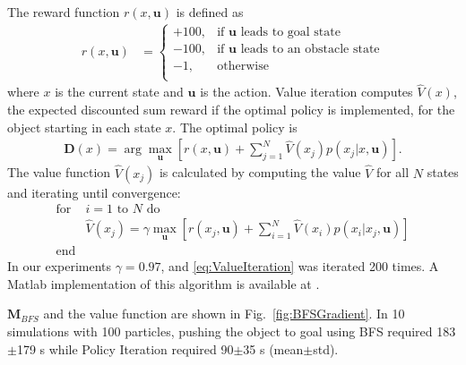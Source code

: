 The reward function $r(x,\mathbf{u})$ is defined as
\begin{align}
r(x,\mathbf{u}) &=  \left\{
\begin{array}{ll}
     +100, &  \textrm{if } \mathbf{u} \textrm{ leads to goal state}\\
      -100, & \textrm{if } \mathbf{u} \textrm{ leads to an obstacle state} \\
      -1, & \textrm{otherwise}\\
\end{array} 
\right.
\end{align}
 where $x$ is the current state and $\mathbf{u}$ is the action.   %
  Value iteration computes $\hat{V}(x)$, the expected discounted sum reward if the optimal policy is implemented, for the object starting in each state $x$. The optimal policy is %
   \begin{align} \mathbf{D}(x) = \arg\max_{\mathbf{u}}   [ r(x,\mathbf{u}) + \sum\limits_{j=1}^N \hat{V}(x_j) p(x_j|x, \mathbf{u})].  \label{eq:OptimalPolicy}
   \end{align}
   The value function $\hat{V}(x_j) $ is calculated by computing the value $\hat{V}$ for all $N$ states and iterating until convergence:
\begin{align}
\text{for }&\text{$i=1$ to $N$ do} \nonumber \\
&\hat{V} (x_j) = \gamma \max_{\mathbf{u}} [r(x_j,\mathbf{u}) + \sum\limits_{i=1}^N \hat{V}(x_i) p(x_i| x_j,\mathbf{u})] \label{eq:ValueIteration} \nonumber\\
\text{end}& 
\end{align}
In our experiments $\gamma = 0.97$, and \eqref{eq:ValueIteration} was iterated 200 times. A {\sc Matlab} implementation of this algorithm is available at \cite{Becker2015MDP}.

$\mathbf{M}_{BFS}$ and the value function are shown in Fig.~\ref{fig:BFSGradient}. 
In 10 simulations with 100 particles, pushing the object to goal using BFS required 183$\pm$179 s while Policy Iteration required 90$\pm$35 s (mean$\pm$std).

